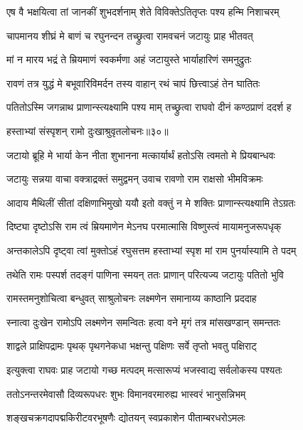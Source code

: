 \twolineshloka
{एष वै भक्षयित्वा तां जानकीं शुभदर्शनाम्}
{शेते विविक्तेऽतितृप्तः पश्य हन्मि निशाचरम्} %

\twolineshloka
{चापमानय शीघ्रं मे बाणं च रघुनन्दन}
{तच्छ्रुत्वा रामवचनं जटायुः प्राह भीतवत्} %

\twolineshloka
{मां न मारय भद्रं ते म्रियमाणं स्वकर्मणा}
{अहं जटायुस्ते भार्याहारिणं समनुद्रुतः} %

\twolineshloka
{रावणं तत्र युद्धं मे बभूवारिविमर्दन}
{तस्य वाहान् रथं चापं छित्त्वाऽहं तेन घातितः} %

\twolineshloka
{पतितोऽस्मि जगन्नाथ प्राणान्स्त्यक्ष्यामि पश्य माम्}
{तच्छ्रुत्वा राघवो दीनं कण्ठप्राणं ददर्श ह} %

{हस्ताभ्यां संस्पृशन् रामो दुःखाश्रुवृतलोचनः॥३०॥} %


\twolineshloka
{जटायो ब्रूहि मे भार्या केन नीता शुभानना}
{मत्कार्यार्थं हतोऽसि त्वमतो मे प्रियबान्धवः} %

\twolineshloka
{जटायुः सन्नया वाचा वक्त्राद्रक्तं समुद्वमन्}
{उवाच रावणो राम राक्षसो भीमविक्रमः} %

\twolineshloka
{आदाय मैथिलीं सीतां दक्षिणाभिमुखो ययौ}
{इतो वक्तुं न मे शक्तिः प्राणान्स्त्यक्ष्यामि तेऽग्रतः} %

\twolineshloka
{दिष्ट्या दृष्टोऽसि राम त्वं म्रियमाणेन मेऽनघ}
{परमात्मासि विष्णुस्त्वं मायामनुजरूपधृक्} %

\twolineshloka
{अन्तकालेऽपि दृष्ट्वा त्वां मुक्तोऽहं रघुसत्तम}
{हस्ताभ्यां स्पृश मां राम पुनर्यास्यामि ते पदम्} %

\twolineshloka
{तथेति रामः पस्पर्श तदङ्गं पाणिना स्मयन्}
{ततः प्राणान् परित्यज्य जटायुः पतितो भुवि} %

\twolineshloka
{रामस्तमनुशोचित्वा बन्धुवत् साश्रुलोचनः}
{लक्ष्मणेन समानाय्य काष्ठानि प्रददाह} %

\twolineshloka
{स्नात्वा दुःखेन रामोऽपि लक्ष्मणेन समन्वितः}
{हत्वा वने मृगं तत्र मांसखण्डान् समन्ततः} %

\twolineshloka
{शाद्वले प्राक्षिपद्रामः पृथक् पृथगनेकधा}
{भक्षन्तु पक्षिणः सर्वे तृप्तो भवतु पक्षिराट्} %

\twolineshloka
{इत्युक्त्वा राघवः प्राह जटायो गच्छ मत्पदम्}
{मत्सारूप्यं भजस्वाद्य सर्वलोकस्य पश्यतः} %

\twolineshloka
{ततोऽनन्तरमेवासौ दिव्यरूपधरः शुभः}
{विमानवरमारुह्य भास्वरं भानुसन्निभम्} %

\twolineshloka
{शङ्खचक्रगदापद्मकिरीटवरभूषणैः}
{द्योतयन् स्वप्रकाशेन पीताम्बरधरोऽमलः} %

